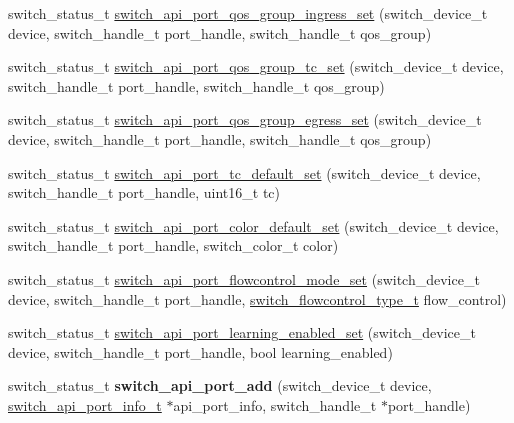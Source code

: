 \begin{DoxyCompactItemize}
\item 
switch\+\_\+status\+\_\+t \hyperlink{group__Port_ga34d51ea3998db1770eb9407d78ebd6b8}{switch\+\_\+api\+\_\+port\+\_\+qos\+\_\+group\+\_\+ingress\+\_\+set} (switch\+\_\+device\+\_\+t device, switch\+\_\+handle\+\_\+t port\+\_\+handle, switch\+\_\+handle\+\_\+t qos\+\_\+group)
\item 
switch\+\_\+status\+\_\+t \hyperlink{group__Port_ga2b82c770363f57e50782a36cf82404b9}{switch\+\_\+api\+\_\+port\+\_\+qos\+\_\+group\+\_\+tc\+\_\+set} (switch\+\_\+device\+\_\+t device, switch\+\_\+handle\+\_\+t port\+\_\+handle, switch\+\_\+handle\+\_\+t qos\+\_\+group)
\item 
switch\+\_\+status\+\_\+t \hyperlink{group__Port_ga6bc054f158879dbcdde33f1e9999b01d}{switch\+\_\+api\+\_\+port\+\_\+qos\+\_\+group\+\_\+egress\+\_\+set} (switch\+\_\+device\+\_\+t device, switch\+\_\+handle\+\_\+t port\+\_\+handle, switch\+\_\+handle\+\_\+t qos\+\_\+group)
\item 
switch\+\_\+status\+\_\+t \hyperlink{group__Port_gae6a69047950e2a21e2d1a6f1ddc1df92}{switch\+\_\+api\+\_\+port\+\_\+tc\+\_\+default\+\_\+set} (switch\+\_\+device\+\_\+t device, switch\+\_\+handle\+\_\+t port\+\_\+handle, uint16\+\_\+t tc)
\item 
switch\+\_\+status\+\_\+t \hyperlink{group__Port_ga92721b7ede03602aa2b58c4e67d64254}{switch\+\_\+api\+\_\+port\+\_\+color\+\_\+default\+\_\+set} (switch\+\_\+device\+\_\+t device, switch\+\_\+handle\+\_\+t port\+\_\+handle, switch\+\_\+color\+\_\+t color)
\item 
switch\+\_\+status\+\_\+t \hyperlink{group__Port_ga26c2f4d6224dbdb8c95141df7028de4f}{switch\+\_\+api\+\_\+port\+\_\+flowcontrol\+\_\+mode\+\_\+set} (switch\+\_\+device\+\_\+t device, switch\+\_\+handle\+\_\+t port\+\_\+handle, \hyperlink{group__Port_gad870ecb5980b7fdef2532fbe7ca653db}{switch\+\_\+flowcontrol\+\_\+type\+\_\+t} flow\+\_\+control)
\item 
switch\+\_\+status\+\_\+t \hyperlink{group__Port_gab5b26a9069c497ce53a3fd5405ac93f5}{switch\+\_\+api\+\_\+port\+\_\+learning\+\_\+enabled\+\_\+set} (switch\+\_\+device\+\_\+t device, switch\+\_\+handle\+\_\+t port\+\_\+handle, bool learning\+\_\+enabled)
\item 
\hypertarget{group__Port_ga7f2a89cd322f2490378bc1439b9167ba}{switch\+\_\+status\+\_\+t {\bfseries switch\+\_\+api\+\_\+port\+\_\+add} (switch\+\_\+device\+\_\+t device, \hyperlink{structswitch__api__port__info__s}{switch\+\_\+api\+\_\+port\+\_\+info\+\_\+t} $\ast$api\+\_\+port\+\_\+info, switch\+\_\+handle\+\_\+t $\ast$port\+\_\+handle)}\label{group__Port_ga7f2a89cd322f2490378bc1439b9167ba}


\end{DoxyCompactItemize}
